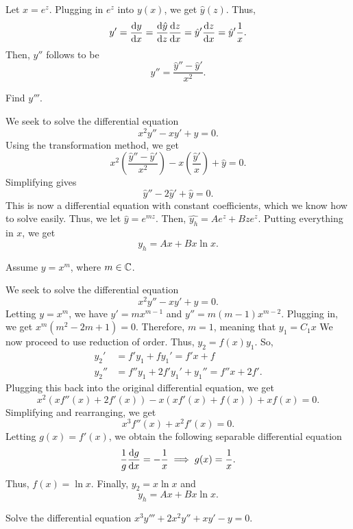 \begin{theorem}
    Let $x = e^{z}$. Plugging in $e^z$ into $y(x)$, we get $\hat{y}(z)$.
    Thus, $$y' = \frac{\dif y}{\dif x} = \frac{\dif \hat{y}}{\dif z}\frac{\dif z}{\dif x} = 
    \hat{y}' \frac{\dif z}{\dif x} = \hat{y}' \frac{1}{x}.$$ Then, $y''$ follows
    to be $$y'' = \frac{\hat{y}''-\hat{y}'}{x^2}.$$
\end{theorem}
\begin{exercise}
    Find $y'''$.
\end{exercise}
\begin{example}
    We seek to solve the differential equation $$x^2y''-xy'+y=0.$$
    Using the transformation method, we get
    $$x^2\left(\frac{\hat{y}''-\hat{y}'}{x^2}\right) 
    - x\left( \frac{\hat{y}'}{x}\right)+\hat{y} = 0.$$ Simplifying gives
    $$\hat{y}''-2\hat{y}'+\hat{y} = 0.$$ This is now a differential
    equation with constant coefficients, which we know how to solve easily.
    Thus, we let $\hat{y} = e^{mz}$. Then, $\hat{y_h} = Ae^{z}+Bze^{z}$. Putting
    everything in $x$, we get $$y_h = Ax+Bx\ln x.$$
\end{example}
\begin{theorem}
    Assume $y=x^m$, where $m \in \mathbb C$.
\end{theorem}
\newpage
\begin{example}
    We seek to solve the differential equation $$x^2y''-xy'+y = 0.$$
    Letting $y=x^m$, we have $y' = mx^{m-1}$ and $y'' = m(m-1)x^{m-2}$.
    Plugging in, we get $x^m\left(m^2-2m+1\right) = 0$. Therefore, $m=1$,
    meaning that $y_1 = C_1x$
    We now proceed to use reduction of order. Thus, $y_2 = f(x)y_1$.
    So, 
    \begin{align*}
        y_2' &= f'y_1+fy_1'=f'x+f \\
        y_2'' &= f''y_1+2f'y_1'+y_1''=f''x+2f'.
    \end{align*}
    Plugging this back into the original differential equation, we get
    $$x^2\left(xf''(x)+2f'(x)\right)-x\left(xf'(x)+f(x)\right)+xf(x) = 0.$$
    Simplifying and rearranging, we get $$x^3f''(x)+x^2f'(x) = 0.$$ Letting
    $g(x) = f'(x)$, we obtain the following separable differential equation
    $$\frac{1}{g} \frac{\dif g}{\dif x} = -\frac{1}{x} \implies g(x) = \frac{1}{x}.$$
    Thus, $f(x) = \ln x$. Finally, $y_2 = x \ln x$ and $$y_h = Ax+Bx\ln x.$$
\end{example}
\begin{exercise}
    Solve the differential equation $x^3y'''+2x^2y''+xy'-y = 0$.
\end{exercise}
